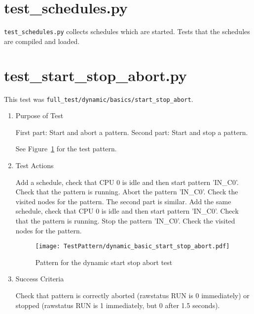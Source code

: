 \documentclass[12pt,a4paper]{report}
\begin{document}
\section{test\_schedules.py}
\texttt{test\_schedules.py} collects schedules which are started. Tests that the schedules are compiled and loaded.



\section{test\_start\_stop\_abort.py}
This test was \texttt{full\_test/dynamic/basics/start\_stop\_abort}.
\begin{enumerate}
  \item Purpose of Test

    First part: Start and abort a pattern. Second part: Start and stop a pattern.

  See Figure~\ref{fig:Pattern_for_the_dynamic_start_stop_abort_test} for the test pattern.
  \item Test Actions

    Add a schedule, check that CPU 0 is idle and then start pattern 'IN\_C0'. Check that the pattern is running.
    Abort the pattern 'IN\_C0'. Check the visited nodes for the pattern. The second part is similar.
    Add the same schedule, check that CPU 0 is idle and then start pattern 'IN\_C0'. Check that the pattern is running.
    Stop the pattern 'IN\_C0'. Check the visited nodes for the pattern.
    \begin{figure}
        \centering
        \texttt{[image: TestPattern/dynamic\_basic\_start\_stop\_abort.pdf]}
        \caption{Pattern for the dynamic start stop abort test}
        \label{fig:Pattern_for_the_dynamic_start_stop_abort_test}
    \end{figure}
  \item Success Criteria

  Check that pattern is correctly aborted (rawstatus RUN is 0 immediately) or
  stopped (rawstatus RUN is 1 immediately, but 0 after 1.5 seconds).
\end{enumerate}
\end{document}
